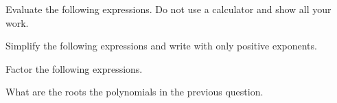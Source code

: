 \documentclass[11pt]{exam}
\begin{document}
\begin{questions}
\addpoints
\question Evaluate the following expressions.  Do not use a calculator and show all your work.


\question Simplify the following expressions and write with only positive exponents.


\newpage 
\addpoints

\question Factor the following expressions.

\question[4] What are the roots the polynomials in the previous question.
\vfill

\end{questions}
\end{document}
